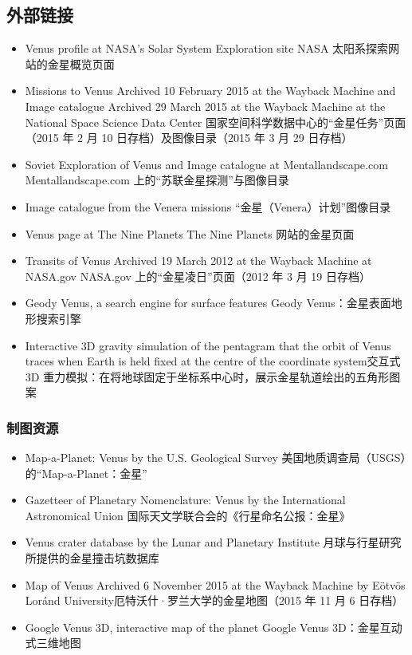 \subsection{外部链接}
\begin{itemize}
\item Venus profile at NASA's Solar System Exploration site
NASA 太阳系探索网站的金星概览页面
\item Missions to Venus Archived 10 February 2015 at the Wayback Machine and Image catalogue Archived 29 March 2015 at the Wayback Machine at the National Space Science Data Center
国家空间科学数据中心的“金星任务”页面（2015 年 2 月 10 日存档）及图像目录（2015 年 3 月 29 日存档）
\item Soviet Exploration of Venus and Image catalogue at Mentallandscape.com Mentallandscape.com 上的“苏联金星探测”与图像目录
\item Image catalogue from the Venera missions “金星（Venera）计划”图像目录

\item Venus page at The Nine Planets The Nine Planets 网站的金星页面

\item Transits of Venus Archived 19 March 2012 at the Wayback Machine at NASA.gov NASA.gov 上的“金星凌日”页面（2012 年 3 月 19 日存档）
\item Geody Venus, a search engine for surface features Geody Venus：金星表面地形搜索引擎
\item Interactive 3D gravity simulation of the pentagram that the orbit of Venus traces when Earth is held fixed at the centre of the coordinate system交互式 3D 重力模拟：在将地球固定于坐标系中心时，展示金星轨道绘出的五角形图案
\end{itemize}
\subsubsection{制图资源}
\begin{itemize}
\item Map-a-Planet: Venus by the U.S. Geological Survey
美国地质调查局（USGS）的“Map-a-Planet：金星”
\item Gazetteer of Planetary Nomenclature: Venus by the International Astronomical Union 国际天文学联合会的《行星命名公报：金星》
\item Venus crater database by the Lunar and Planetary Institute 月球与行星研究所提供的金星撞击坑数据库
\item Map of Venus Archived 6 November 2015 at the Wayback Machine by Eötvös Loránd University厄特沃什·罗兰大学的金星地图（2015 年 11 月 6 日存档）
\item Google Venus 3D, interactive map of the planet Google Venus 3D：金星互动式三维地图
\end{itemize}


